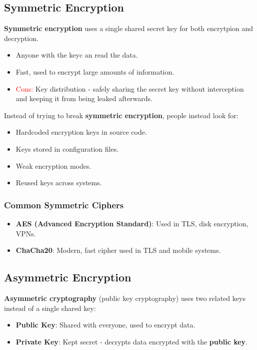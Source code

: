 \documentclass[12pt, letterpaper]{article}
\begin{document}
\subsection*{Symmetric Encryption}

\textbf{Symmetric encryption} uses a single shared secret key for both encrytpion and decryption.

\begin{itemize}
    \item Anyone with the keyc an read the data.
    \item Fast, used to encrypt large amounts of information.
    \item \textcolor{red}{Cons:} Key distribution - safely sharing the secret key without interception and keeping it from being leaked afterwards.
\end{itemize}

\bigskip

Instead of trying to break \textbf{symmetric encryption}, people instead look for:

\begin{itemize}
    \item Hardcoded encryption keys in source code.
    \item Keys stored in configuration files.
    \item Weak encryption modes.
    \item Reused keys across systems.
\end{itemize}

\subsubsection*{Common Symmetric Ciphers}

\begin{itemize}
    \item \textbf{AES (Advanced Encryption Standard)}: Used in TLS, disk encryption, VPNs.
    \item \textbf{ChaCha20}: Modern, fast cipher used in TLS and mobile systems.
\end{itemize}

\subsection*{Asymmetric Encryption}

\textbf{Asymmetric cryptography} (public key cryptography) uses two related keys instead of a single shared key:

\begin{itemize}
    \item \textbf \textbf{Public Key}: Shared with everyone, used to encrypt data.
    \item \textbf \textbf{Private Key}: Kept secret - decrypts data encrypted with the \textbf{public key}.
\end{itemize}
\end{document}

